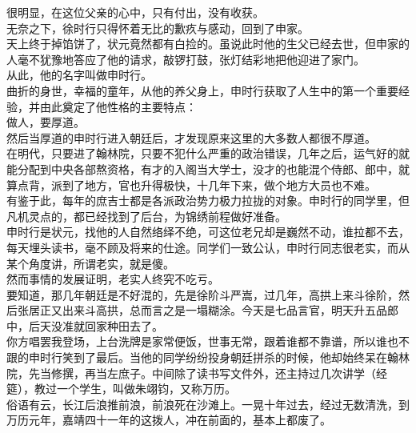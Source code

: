 \begin{multicols}{\theparacolNo}
很明显，在这位父亲的心中，只有付出，没有收获。\\

无奈之下，徐时行只得怀着无比的歉疚与感动，回到了申家。\\

天上终于掉馅饼了，状元竟然都有白捡的。虽说此时他的生父已经去世，但申家的人毫不犹豫地答应了他的请求，敲锣打鼓，张灯结彩地把他迎进了家门。\\

从此，他的名字叫做申时行。\\

曲折的身世，幸福的童年，从他的养父身上，申时行获取了人生中的第一个重要经验，并由此奠定了他性格的主要特点：\\

做人，要厚道。\\

然后当厚道的申时行进入朝廷后，才发现原来这里的大多数人都很不厚道。\\

在明代，只要进了翰林院，只要不犯什么严重的政治错误，几年之后，运气好的就能分配到中央各部熬资格，有才的入阁当大学士，没才的也能混个侍郎、郎中，就算点背，派到了地方，官也升得极快，十几年下来，做个地方大员也不难。\\

有鉴于此，每年的庶吉士都是各派政治势力极力拉拢的对象。申时行的同学里，但凡机灵点的，都已经找到了后台，为锦绣前程做好准备。\\

申时行是状元，找他的人自然络绎不绝，可这位老兄却是巍然不动，谁拉都不去，每天埋头读书，毫不顾及将来的仕途。同学们一致公认，申时行同志很老实，而从某个角度讲，所谓老实，就是傻。\\

然而事情的发展证明，老实人终究不吃亏。\\

要知道，那几年朝廷是不好混的，先是徐阶斗严嵩，过几年，高拱上来斗徐阶，然后张居正又出来斗高拱，总而言之是一塌糊涂。今天是七品言官，明天升五品郎中，后天没准就回家种田去了。\\

你方唱罢我登场，上台洗牌是家常便饭，世事无常，跟着谁都不靠谱，所以谁也不跟的申时行笑到了最后。当他的同学纷纷投身朝廷拼杀的时候，他却始终呆在翰林院，先当修撰，再当左庶子。中间除了读书写文件外，还主持过几次讲学（经筵），教过一个学生，叫做朱翊钧，又称万历。\\

俗语有云，长江后浪推前浪，前浪死在沙滩上。一晃十年过去，经过无数清洗，到万历元年，嘉靖四十一年的这拨人，冲在前面的，基本上都废了。\\


\end{multicols}
